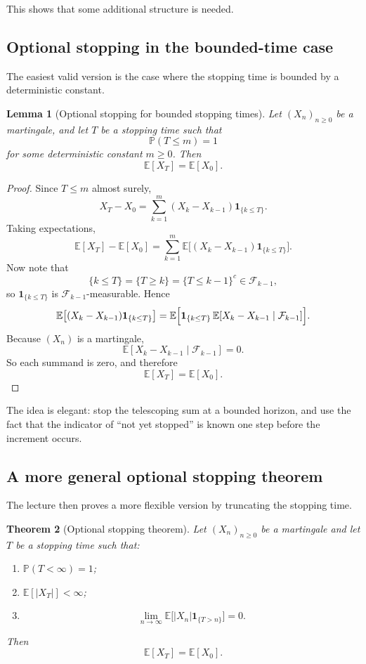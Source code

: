 \documentclass[11pt]{article}
\newtheorem{theorem}{Theorem}[section]
\newtheorem{lemma}[theorem]{Lemma}
\theoremstyle{definition}
\begin{document}
This shows that some additional structure is needed.

\subsection{Optional stopping in the bounded-time case}

The easiest valid version is the case where the stopping time is bounded by a deterministic constant.

\begin{lemma}[Optional stopping for bounded stopping times]
Let \((X_n)_{n\ge 0}\) be a martingale, and let \(T\) be a stopping time such that
\[
\mathbb P(T\le m)=1
\]
for some deterministic constant \(m\ge 0\). Then
\[
\mathbb E[X_T]=\mathbb E[X_0].
\]
\end{lemma}

\begin{proof}
Since \(T\le m\) almost surely,
\[
X_T-X_0=\sum_{k=1}^m (X_k-X_{k-1})\mathbf 1_{\{k\le T\}}.
\]
Taking expectations,
\[
\mathbb E[X_T]-\mathbb E[X_0]
=
\sum_{k=1}^m \mathbb E\bigl[(X_k-X_{k-1})\mathbf 1_{\{k\le T\}}\bigr].
\]
Now note that
\[
\{k\le T\}=\{T\ge k\}=\{T\le k-1\}^c\in \mathcal F_{k-1},
\]
so \(\mathbf 1_{\{k\le T\}}\) is \(\mathcal F_{k-1}\)-measurable. Hence
\[
\mathbb E\bigl[(X_k-X_{k-1})\mathbf 1_{\{k\le T\}}\bigr]
=
\mathbb E\Bigl[\mathbf 1_{\{k\le T\}}\,\mathbb E[X_k-X_{k-1}\mid \mathcal F_{k-1}]\Bigr].
\]
Because \((X_n)\) is a martingale,
\[
\mathbb E[X_k-X_{k-1}\mid \mathcal F_{k-1}]=0.
\]
So each summand is zero, and therefore
\[
\mathbb E[X_T]=\mathbb E[X_0].
\]
\end{proof}

The idea is elegant: stop the telescoping sum at a bounded horizon, and use the fact that the indicator of ``not yet stopped'' is known one step before the increment occurs.

\subsection{A more general optional stopping theorem}

The lecture then proves a more flexible version by truncating the stopping time.

\begin{theorem}[Optional stopping theorem]
Let \((X_n)_{n\ge 0}\) be a martingale and let \(T\) be a stopping time such that:
\begin{enumerate}[label=(\roman*)]
    \item \(\mathbb P(T<\infty)=1\);
    \item \(\mathbb E[|X_T|]<\infty\);
    \item
    \[
    \lim_{n\to\infty}\mathbb E\bigl[|X_n|\mathbf 1_{\{T>n\}}\bigr]=0.
    \]
\end{enumerate}
Then
\[
\mathbb E[X_T]=\mathbb E[X_0].
\]
\end{theorem}
\end{document}
